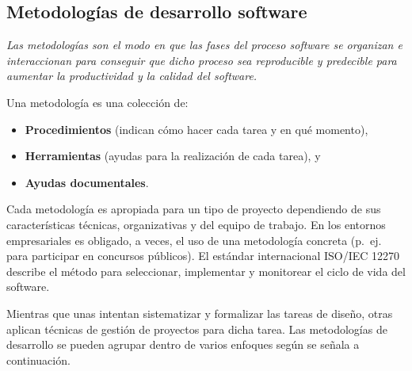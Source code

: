 \subsection{Metodologías de desarrollo software}
\emph{Las metodologías son el modo en que las fases del proceso software se organizan e interaccionan para conseguir que dicho proceso sea reproducible y predecible para aumentar la productividad y la calidad del software.}

Una metodología es una colección de:

\begin{itemize}
\item \textbf{Procedimientos} (indican cómo hacer cada tarea y en qué momento),
\item \textbf{Herramientas} (ayudas para la realización de cada tarea), y
\item \textbf{Ayudas documentales}.
\end{itemize}

Cada metodología es apropiada para un tipo de proyecto dependiendo de sus 
características técnicas, organizativas y del equipo de trabajo. En los 
entornos empresariales es obligado, a veces, el uso de una metodología 
concreta (p.~ej. para participar en concursos públicos). El estándar 
internacional ISO/IEC 12270 describe el método para 
seleccionar, implementar y monitorear el ciclo de vida del software.

Mientras que unas intentan sistematizar y formalizar las tareas de diseño, otras aplican técnicas de gestión de proyectos para dicha tarea. Las metodologías de desarrollo se pueden agrupar dentro de varios enfoques según se señala a continuación.

